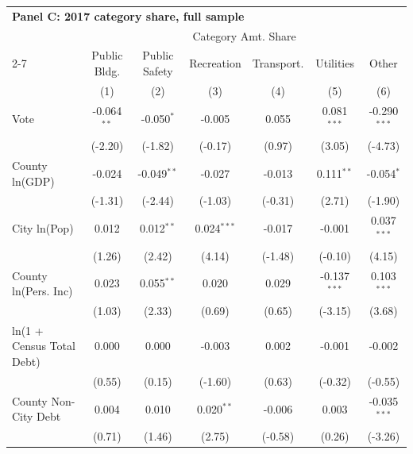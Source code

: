 \begingroup
\centering
\begin{tabular*}{\textwidth}{@{\extracolsep{\fill}}lcccccc}
\multicolumn{5}{l}{\textbf{Panel C: 2017 category share, full sample}}\\

\addlinespace
   \toprule
    & \multicolumn{6}{c}{Category Amt. Share}\\
   \cmidrule(lr){2-7}
                             & Public Bldg.  & Public Safety & Recreation    & Transport.    & Utilities      & Other \\   
                             & (1)           & (2)           & (3)           & (4)           & (5)            & (6)\\  
   \midrule 
   Vote                      & -0.064$^{**}$ & -0.050$^{*}$  & -0.005        & 0.055         & 0.081$^{***}$  & -0.290$^{***}$\\   
                             & (-2.20)      & (-1.82)      & (-0.17)      & (0.97)       & (3.05)        & (-4.73)\\   
   County ln(GDP)            & -0.024        & -0.049$^{**}$ & -0.027        & -0.013        & 0.111$^{**}$   & -0.054$^{*}$\\   
                             & (-1.31)      & (-2.44)      & (-1.03)      & (-0.31)      & (2.71)        & (-1.90)\\   
   City ln(Pop)              & 0.012         & 0.012$^{**}$  & 0.024$^{***}$ & -0.017        & -0.001         & 0.037$^{***}$\\   
                             & (1.26)       & (2.42)       & (4.14)       & (-1.48)      & (-0.10)       & (4.15)\\   
   County ln(Pers. Inc)      & 0.023         & 0.055$^{**}$  & 0.020         & 0.029         & -0.137$^{***}$ & 0.103$^{***}$\\   
                             & (1.03)       & (2.33)       & (0.69)       & (0.65)       & (-3.15)       & (3.68)\\   
   ln(1 + Census Total Debt) & 0.000         & 0.000         & -0.003        & 0.002         & -0.001         & -0.002\\   
                             & (0.55)       & (0.15)       & (-1.60)      & (0.63)       & (-0.32)       & (-0.55)\\   
   County Non-City Debt      & 0.004         & 0.010         & 0.020$^{**}$  & -0.006        & 0.003          & -0.035$^{***}$\\   
                             & (0.71)       & (1.46)       & (2.75)       & (-0.58)      & (0.26)        & (-3.26)\\   

\end{tabular*}
